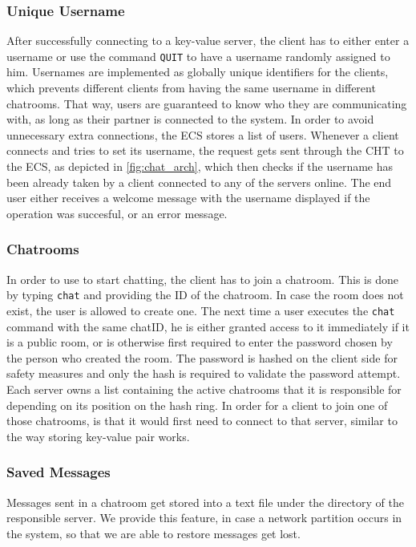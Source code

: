 \subsubsection{Unique Username}
\label{sec:groupchat_funtionalities_uniqueusername}
After successfully connecting to a key-value server, the client has to either enter a username or use the command \texttt{QUIT} to have a username randomly assigned to him. Usernames are implemented as globally unique identifiers for the clients, which prevents different clients from having the same username in different chatrooms. That way, users are guaranteed to know who they are communicating with, as long as their partner is connected to the system.
In order to avoid unnecessary extra connections, the ECS stores a list of users. Whenever a client connects and tries to set its username, the request gets sent through the CHT to the ECS, as depicted in \ref{fig:chat_arch}, which then checks if the username has been already taken by a client connected to any of the servers online. The end user either receives a welcome message with the username displayed if the operation was succesful, or an error message.
 
\subsubsection{Chatrooms}
\label{sec:groupchat_funtionalities_chatcommand}
In order to use to start chatting, the client has to join a chatroom. This is done by typing \texttt{chat} and providing the ID of the chatroom. In case the room does not exist, the user is allowed to create one. The next time a user executes the \texttt{chat} command with the same chatID, he is either granted access to it immediately if it is a public room, or is otherwise first required to enter the password chosen by the person who created the room. The password is hashed on the client side for safety measures and only the hash is required to validate the password attempt.
Each server owns a list containing the active chatrooms that it is responsible for depending on its position on the hash ring. In order for a client to join one of those chatrooms, is that it would first need to connect to that server, similar to the way storing key-value pair works.

\subsubsection{Saved Messages}
\label{sec:groupchat_funtionalities_savedmessages}
Messages sent in a chatroom get stored into a text file under the directory of the responsible server. We provide this feature, in case a network partition occurs in the system, so that we are able to restore messages get lost.

